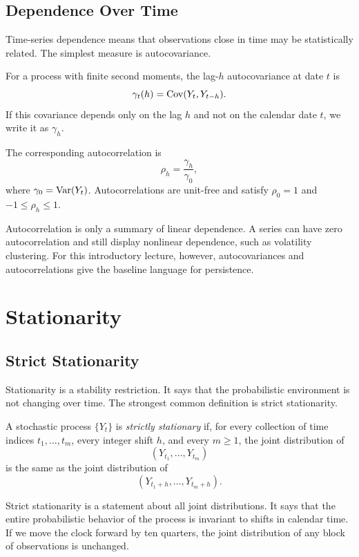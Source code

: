 \subsection{Dependence Over Time}
Time-series dependence means that observations close in time may be statistically related. The simplest measure is autocovariance.

\begin{defN}
For a process with finite second moments, the lag-$h$ autocovariance at date $t$ is
\[
\gamma_t(h)=\operatorname{Cov}(Y_t,Y_{t-h}).
\]
If this covariance depends only on the lag $h$ and not on the calendar date $t$, we write it as $\gamma_h$.
\end{defN}

The corresponding autocorrelation is
\[
\rho_h=\frac{\gamma_h}{\gamma_0},
\]
where $\gamma_0=\operatorname{Var}(Y_t)$. Autocorrelations are unit-free and satisfy $\rho_0=1$ and $-1\leq \rho_h\leq 1$.

Autocorrelation is only a summary of linear dependence. A series can have zero autocorrelation and still display nonlinear dependence, such as volatility clustering. For this introductory lecture, however, autocovariances and autocorrelations give the baseline language for persistence.

\section{Stationarity}

\subsection{Strict Stationarity}
Stationarity is a stability restriction. It says that the probabilistic environment is not changing over time. The strongest common definition is strict stationarity.

\begin{defN}
A stochastic process $\{Y_t\}$ is \emph{strictly stationary} if, for every collection of time indices $t_1,\ldots,t_m$, every integer shift $h$, and every $m\geq 1$, the joint distribution of
\[
(Y_{t_1},\ldots,Y_{t_m})
\]
is the same as the joint distribution of
\[
(Y_{t_1+h},\ldots,Y_{t_m+h}).
\]
\end{defN}

Strict stationarity is a statement about all joint distributions. It says that the entire probabilistic behavior of the process is invariant to shifts in calendar time. If we move the clock forward by ten quarters, the joint distribution of any block of observations is unchanged.

